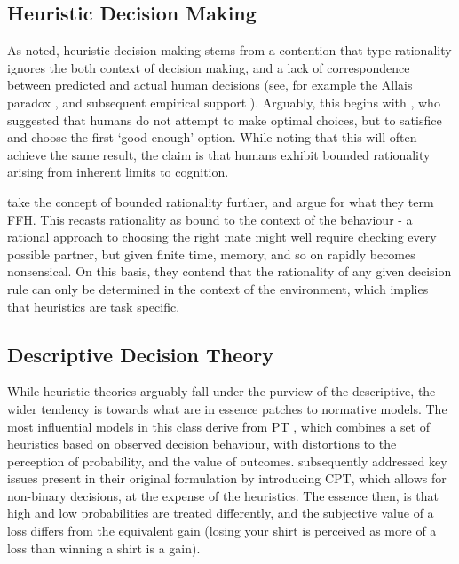 \subsection{Heuristic Decision Making}\label{sub:heuristic_theories}

As noted, heuristic decision making stems from a contention that \citeauthor{Neumann1953} type rationality ignores the both context of decision making, and a lack of correspondence between predicted and actual human decisions (see, for example the Allais paradox \citep{Society2013}, and subsequent empirical support \citep{Oliver2003,Burke1996}). Arguably, this begins with \citet{Simon1956}, who suggested that humans do not attempt to make optimal choices, but to satisfice and choose the first `good enough' option. While noting that this will often achieve the same result, the claim is that humans exhibit bounded rationality \citep{Simon2000} arising from inherent limits to cognition.

\citet{Gigerenzer1996} take the concept of bounded rationality further, and argue for what they term \ac{FFH}. This recasts rationality as bound to the context of the behaviour - a rational approach to choosing the right mate might well require checking every possible partner, but given finite time, memory, and so on rapidly becomes nonsensical. On this basis, they contend that the rationality of any given decision rule can only be determined in the context of the environment, which implies that heuristics are task specific.

\subsection{Descriptive Decision Theory}\label{sub:descriptive_theories}

While heuristic theories arguably fall under the purview of the descriptive, the wider tendency is towards what are in essence patches to normative models. The most influential models in this class derive from \ac{PT} \citep{Kahneman1979}, which combines a set of heuristics based on observed decision behaviour, with distortions to the perception of probability, and the value of outcomes. \citet{Tversky1992} subsequently addressed key issues present in their original formulation by introducing \ac{CPT}, which allows for non-binary decisions, at the expense of the heuristics. The essence then, is that high and low probabilities are treated differently, and the subjective value of a loss differs from the equivalent gain (losing your shirt is perceived as more of a loss than winning a shirt is a gain). 


